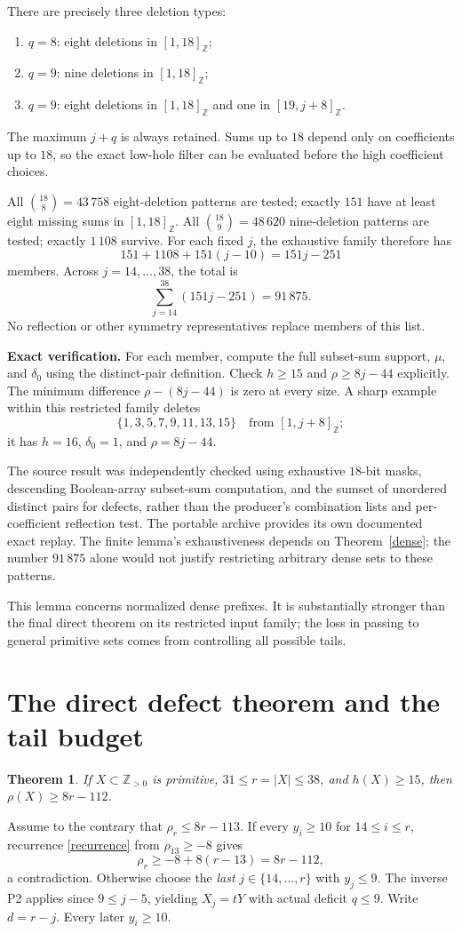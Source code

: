 \documentclass[11pt,a4paper]{article}
\newcommand{\Z}{\mathbb Z}
\newcommand{\ints}[2]{[#1,#2]_{\Z}}
\newcommand{\dd}{\delta_0}
\newtheorem{theorem}{Theorem}
\begin{document}
There are precisely three deletion types:
\begin{enumerate}
\item $q=8$: eight deletions in $\ints1{18}$;
\item $q=9$: nine deletions in $\ints1{18}$;
\item $q=9$: eight deletions in $\ints1{18}$ and one in $\ints{19}{j+8}$.
\end{enumerate}
The maximum $j+q$ is always retained. Sums up to $18$ depend only on coefficients up to $18$, so the exact low-hole filter can be evaluated before the high coefficient choices.

All $\binom{18}{8}=43\,758$ eight-deletion patterns are tested; exactly $151$ have at least eight missing sums in $\ints1{18}$. All $\binom{18}{9}=48\,620$ nine-deletion patterns are tested; exactly $1\,108$ survive. For each fixed $j$, the exhaustive family therefore has
\[
151+1108+151(j-10)=151j-251
\]
members. Across $j=14,\ldots,38$, the total is
\[
\sum_{j=14}^{38}(151j-251)=91\,875.
\]
No reflection or other symmetry representatives replace members of this list.

\textbf{Exact verification.} For each member, compute the full subset-sum support, $\mu$, and $\dd$ using the distinct-pair definition. Check $h\ge15$ and $\rho\ge8j-44$ explicitly. The minimum difference $\rho-(8j-44)$ is zero at every size. A sharp example within this restricted family deletes
\[
\{1,3,5,7,9,11,13,15\}\quad\text{from }\ints1{j+8};
\]
it has $h=16$, $\dd=1$, and $\rho=8j-44$.

The source result was independently checked using exhaustive $18$-bit masks, descending Boolean-array subset-sum computation, and the sumset of unordered distinct pairs for defects, rather than the producer's combination lists and per-coefficient reflection test. The portable archive provides its own documented exact replay. The finite lemma's exhaustiveness depends on Theorem~\ref{dense}; the number $91\,875$ alone would not justify restricting arbitrary dense sets to these patterns.

This lemma concerns normalized dense prefixes. It is substantially stronger than the final direct theorem on its restricted input family; the loss in passing to general primitive sets comes from controlling all possible tails.

\newpage
\section{The direct defect theorem and the tail budget}
\begin{theorem}\label{direct}
If $X\subset\Z_{>0}$ is primitive, $31\le r=|X|\le38$, and $h(X)\ge15$, then $\rho(X)\ge8r-112$.
\end{theorem}
Assume to the contrary that $\rho_r\le8r-113$. If every $y_i\ge10$ for $14\le i\le r$, recurrence \eqref{recurrence} from $\rho_{13}\ge-8$ gives
\[
\rho_r\ge-8+8(r-13)=8r-112,
\]
a contradiction. Otherwise choose the \emph{last} $j\in\{14,\ldots,r\}$ with $y_j\le9$. The inverse P2 applies since $9\le j-5$, yielding $X_j=tY$ with actual deficit $q\le9$. Write $d=r-j$. Every later $y_i\ge10$.
\end{document}
